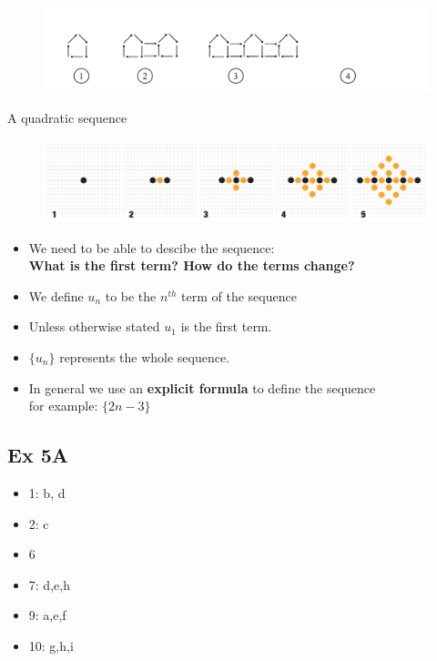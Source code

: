 \documentclass[12pt]{article}
\begin{document}
\begin{figure}[!h]
	\centering
	\includegraphics[width=17cm]{matches_06.png} 
\end{figure}

A quadratic sequence

\begin{figure}[!h]
	\centering
	\includegraphics[width=17cm]{QPattern.pdf} 
\end{figure}



\begin{itemize}
\item We need to be able to descibe the sequence:\\
\textbf{What is the first term? How do the terms change?}
\item We define $u_n$ to be the $n^{th}$ term of the sequence
\item Unless otherwise stated $u_1$ is the first term.
\item  $\{u_n\}$ represents the whole sequence.
\item In general we use an \textbf{explicit formula} to define the sequence\\
for example: $\{2n-3\}$

\end{itemize}
\normalsize
\newpage

\subsection*{Ex 5A}
\begin{multicols}{3}
\begin{itemize}
	\item 1: b, d
	\item 2: c
	\item 6
	\item 7: d,e,h
	\item 9: a,e,f
	\item 10: g,h,i
\end{itemize}	
\end{multicols}
\end{document}
